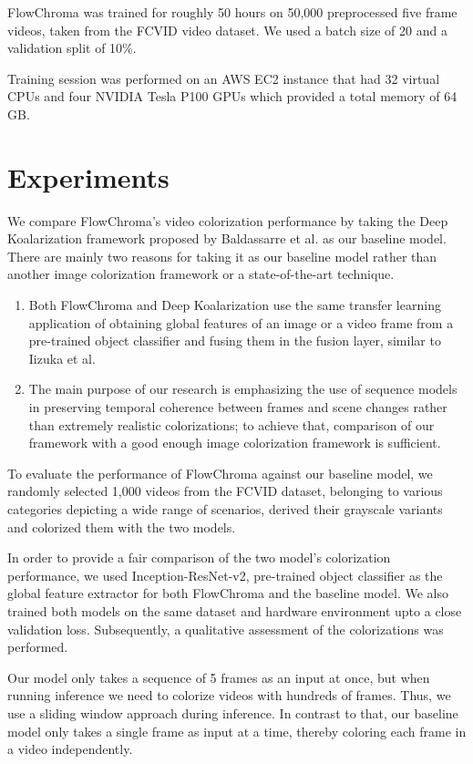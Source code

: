 \documentclass[10pt,twocolumn,letterpaper]{article}
\begin{document}
FlowChroma was trained for roughly 50 hours on 50,000 preprocessed five frame videos, taken from the FCVID \cite{FCVID} video dataset. We used a batch size of 20 and a validation split of 10\%. 

Training session was performed on an AWS EC2 instance that had 32 virtual CPUs and four NVIDIA Tesla P100 GPUs which provided a total memory of 64 GB.

\section{Experiments}
We compare FlowChroma's video colorization performance by taking the Deep Koalarization framework proposed by Baldassarre et al. as our baseline model. There are mainly two reasons for taking it as our baseline model rather than another image colorization framework or a state-of-the-art technique.
\begin{enumerate}
\item Both FlowChroma and Deep Koalarization use the same transfer learning application of obtaining global features of an image or a video frame from a pre-trained object classifier and fusing them in the fusion layer, similar to Iizuka et al. 
\item The main purpose of our research is emphasizing the use of sequence models in preserving temporal coherence between frames and scene changes rather than extremely realistic colorizations; to achieve that, comparison of our framework with a good enough image colorization framework is sufficient.
\end{enumerate}

To evaluate the performance of FlowChroma against our baseline model, we randomly selected 1,000 videos from the FCVID dataset, belonging to various categories depicting a wide range of scenarios, derived their grayscale variants and colorized them with the two models.

In order to provide a fair comparison of the two model's colorization performance, we used Inception-ResNet-v2, pre-trained object classifier as the global feature extractor for both FlowChroma and the baseline model. We also trained both models on the same dataset and hardware environment upto a close validation loss. Subsequently, a qualitative assessment of the colorizations was performed. 

Our model only takes a sequence of 5 frames as an input at once, but when running inference we need to colorize videos with hundreds of frames. Thus, we use a sliding window approach during inference. In contrast to that, our baseline model only takes a single frame as input at a time, thereby coloring each frame in a video independently.
\end{document}
